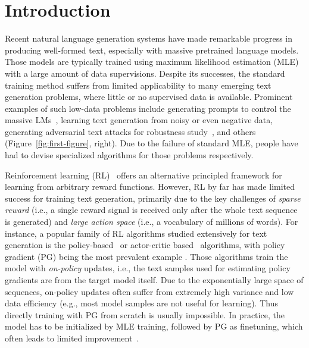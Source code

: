 \section{Introduction}


Recent natural language generation systems have made remarkable progress in producing well-formed text, especially with massive pretrained language models.
Those models are typically trained using maximum likelihood estimation (MLE) with a large amount of data supervisions. 
Despite its successes, the standard training method suffers from limited applicability to many emerging text generation problems, where little or no supervised data is available. Prominent examples of such low-data problems include generating prompts to control the massive LMs~\citep{yin2019benchmarking,shin2020autoprompt,zhong2021meta,liu2021pre}, learning text generation from noisy or even negative data, generating adversarial text attacks for robustness study~\citep{wallace2019universal,atanasova2020generating}, and others (Figure~\ref{fig:first-figure}, right). Due to the failure of standard MLE, people have had to devise specialized algorithms for those problems respectively.

Reinforcement learning (RL)~\citep{sutton2018reinforcement} offers an alternative principled framework for learning from arbitrary reward functions.
However, RL by far has made limited success for training text generation, primarily due to the key challenges of \emph{sparse reward} (i.e., a single reward signal is received only after the whole text sequence is generated) and \emph{large action space} (i.e., a vocabulary of millions of words).
For instance, a popular family of RL algorithms studied extensively for text generation is the policy-based~\citep{williams1992simple} or actor-critic based~\citep{bahdanau2016actor,rennie2017self} algorithms, with policy gradient (PG) being the most prevalent example \citep{ranzato2015sequence,li2016deep,rennie2017self,tan2018connecting,pasunuru2018multi,paulus2018a}. Those algorithms train the model with \emph{on-policy} updates, i.e., the text samples used for estimating policy gradients are from the target model itself. Due to the exponentially large space of sequences, on-policy updates often suffer from extremely high variance and low data efficiency (e.g., most model samples are not useful for learning). Thus directly training with PG from scratch is usually impossible. In practice, the model has to be initialized by MLE training, followed by PG as finetuning, which often leads to limited improvement~\citep{Choshen2020On,wu2018study}.


